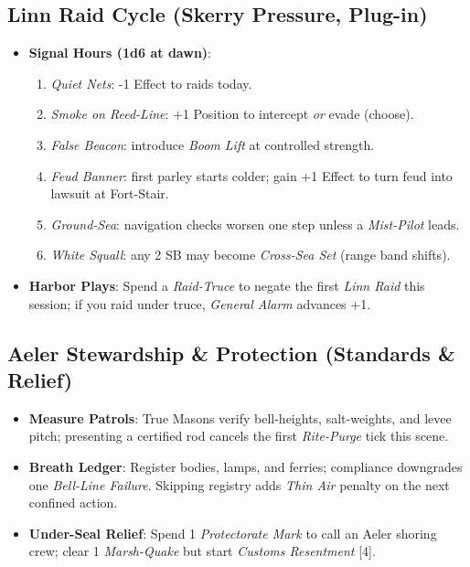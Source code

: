 \subsection*{Linn Raid Cycle (Skerry Pressure, Plug-in)}
\begin{itemize}
  \item \textbf{Signal Hours (1d6 at dawn)}:
  \begin{enumerate}
    \item \emph{Quiet Nets}: -1 Effect to raids today.
    \item \emph{Smoke on Reed-Line}: +1 Position to intercept \emph{or} evade (choose).
    \item \emph{False Beacon}: introduce \emph{Boom Lift} at controlled strength.
    \item \emph{Feud Banner}: first parley starts colder; gain +1 Effect to turn feud into lawsuit at Fort-Stair.
    \item \emph{Ground-Sea}: navigation checks worsen one step unless a \emph{Mist-Pilot} leads.
    \item \emph{White Squall}: any 2 SB may become \emph{Cross-Sea Set} (range band shifts).
  \end{enumerate}
  \item \textbf{Harbor Plays}: Spend a \emph{Raid-Truce} to negate the first \emph{Linn Raid} this session; if you raid under truce, \emph{General Alarm} advances +1.
\end{itemize}

\subsection*{Aeler Stewardship \& Protection (Standards \& Relief)}
\begin{itemize}
  \item \textbf{Measure Patrols}: True Masons verify bell-heights, salt-weights, and levee pitch; presenting a certified rod cancels the first \emph{Rite-Purge} tick this scene.
  \item \textbf{Breath Ledger}: Register bodies, lamps, and ferries; compliance downgrades one \emph{Bell-Line Failure}. Skipping registry adds \emph{Thin Air} penalty on the next confined action.
  \item \textbf{Under-Seal Relief}: Spend 1 \emph{Protectorate Mark} to call an Aeler shoring crew; clear 1 \emph{Marsh-Quake} but start \emph{Customs Resentment} [4].
\end{itemize}

